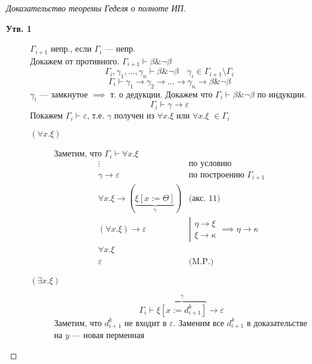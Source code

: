 \documentclass[english]{article}
\begin{document}
\begin{proof}[Доказательство теоремы Геделя о полноте ИП]
	\begin{description}
		\item[{\textbf{Утв. 1}}] \(\Gamma_{i + 1}\) непр., если \(\Gamma_i\) --- непр. \\
			Докажем от противного. \(\Gamma_{i + 1} \vdash \beta \& \neg \beta\)
			\[ \Gamma_i, \gamma_1, \dots, \gamma_n \vdash \beta \& \neg \beta \quad \gamma_i \in \Gamma_{i + 1} \setminus \Gamma_i \]
			\[ \Gamma_i \vdash \gamma_1 \to \gamma_2 \to \dots \to \gamma_n \to \beta \& \neg \beta \]
			\(\gamma_i\) --- замкнутое \(\implies\) т. о дедукции. Докажем что \(\Gamma_i \vdash \beta \& \neg \beta\) по индукции.
			\[ \Gamma_i \vdash \gamma \to \varepsilon \]
			Покажем \(\Gamma_i \vdash \varepsilon\), т.е. \(\gamma\) получен из \(\forall x. \xi\) или \(\forall x. \xi\) \(\in \Gamma_i\)
			\begin{description}
				\item[{\textbf{\((\forall x. \xi)\)}}] Заметим, что \(\Gamma_i \vdash \forall x.\xi\)
					\[ \begin{array}{ll}
							\vdots                                                 & \text{по условию}                                                                                \\
							\gamma \to \varepsilon                                 & \text{по построению }\Gamma_{i + 1}                                                              \\
							\forall x.\xi \to (\underbrace{\xi[x:=\Theta]}_\gamma) & \text{(акс. 11)}                                                                                 \\
							(\forall x.\xi) \to \varepsilon                        & \left|\begin{matrix} \eta \to \xi \\ \xi \to \kappa \end{matrix}\right. \implies \eta \to \kappa \\
							\forall x.\xi                                          &                                                                                                  \\
							\varepsilon                                            & \text{(M.P.)}
						\end{array} \]
				\item[{\textbf{\((\exists x. \xi)\)}}] \[ \Gamma_i \vdash \overbrace{\xi[x:=d^k_{i + 1}]}^\gamma \to \varepsilon \]
					Заметим, что \(d^k_{i + 1}\) не входит в \(\varepsilon\). Заменим все \(d^k_{i + 1}\) в доказательстве на \(y\) --- новая перменная

\end{description}
\end{description}
\end{proof}
\end{document}
